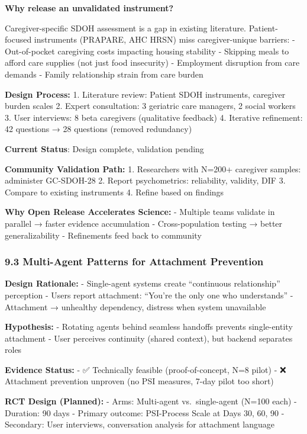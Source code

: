 \documentclass[
]{article}
\begin{document}
\textbf{Why release an unvalidated instrument?}

Caregiver-specific SDOH assessment is a gap in existing literature.
Patient-focused instruments (PRAPARE, AHC HRSN) miss caregiver-unique
barriers: - Out-of-pocket caregiving costs impacting housing stability -
Skipping meals to afford care supplies (not just food insecurity) -
Employment disruption from care demands - Family relationship strain
from care burden

\textbf{Design Process:} 1. Literature review: Patient SDOH instruments,
caregiver burden scales 2. Expert consultation: 3 geriatric care
managers, 2 social workers 3. User interviews: 8 beta caregivers
(qualitative feedback) 4. Iterative refinement: 42 questions → 28
questions (removed redundancy)

\textbf{Current Status}: Design complete, validation pending

\textbf{Community Validation Path:} 1. Researchers with N=200+ caregiver
samples: administer GC-SDOH-28 2. Report psychometrics: reliability,
validity, DIF 3. Compare to existing instruments 4. Refine based on
findings

\textbf{Why Open Release Accelerates Science:} - Multiple teams validate
in parallel → faster evidence accumulation - Cross-population testing →
better generalizability - Refinements feed back to community

\subsubsection{9.3 Multi-Agent Patterns for Attachment
Prevention}\label{multi-agent-patterns-for-attachment-prevention}

\textbf{Design Rationale:} - Single-agent systems create ``continuous
relationship'' perception - Users report attachment: ``You're the only
one who understands'' - Attachment → unhealthy dependency, distress when
system unavailable

\textbf{Hypothesis:} - Rotating agents behind seamless handoffs prevents
single-entity attachment - User perceives continuity (shared context),
but backend separates roles

\textbf{Evidence Status:} - ✅ Technically feasible (proof-of-concept,
N=8 pilot) - ❌ Attachment prevention unproven (no PSI measures, 7-day
pilot too short)

\textbf{RCT Design (Planned):} - Arms: Multi-agent vs.~single-agent
(N=100 each) - Duration: 90 days - Primary outcome: PSI-Process Scale at
Days 30, 60, 90 - Secondary: User interviews, conversation analysis for
attachment language
\end{document}
